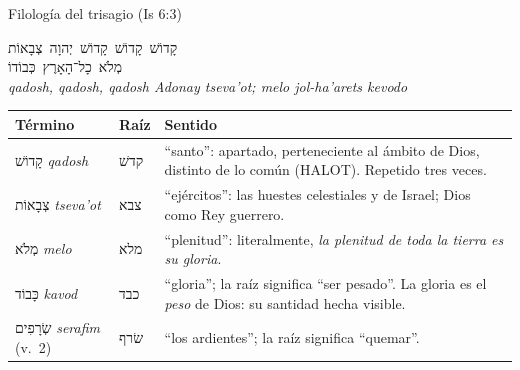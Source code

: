 \documentclass[hyperref={bookmarks=false},aspectratio=169]{beamer}
\newcommand{\heb}[1]{\mbox{\foreignlanguage{hebrew}{#1}}}
\begin{document}
\begin{frame}{Filología del trisagio (Is 6:3)}
\begin{center}
{\Large\heb{קָדוֹשׁ קָדוֹשׁ קָדוֹשׁ יְהוָה צְבָאוֹת}}\\[2pt]
{\large\heb{מְלֹא כָל־הָאָרֶץ כְּבוֹדוֹ}}\\[2pt]
{\footnotesize\emph{qadosh, qadosh, qadosh Adonay tseva'ot; melo jol-ha'arets kevodo}}
\end{center}
\renewcommand{\arraystretch}{1.2}\scriptsize
\begin{tabular}{@{}>{\RaggedRight\arraybackslash}p{2.5cm}>{\RaggedRight\arraybackslash}p{1.5cm}>{\RaggedRight\arraybackslash}p{7.6cm}@{}}
\toprule
\textbf{Término} & \textbf{Raíz} & \textbf{Sentido} \\ \midrule
\heb{קָדוֹשׁ} \emph{qadosh} & \heb{קדשׁ} & ``santo'': apartado, perteneciente al ámbito de Dios, distinto de lo común (HALOT). Repetido tres veces. \\
\heb{צְבָאוֹת} \emph{tseva'ot} & \heb{צבא} & ``ejércitos'': las huestes celestiales y de Israel; Dios como Rey guerrero. \\
\heb{מְלֹא} \emph{melo} & \heb{מלא} & ``plenitud'': literalmente, \emph{la plenitud de toda la tierra es su gloria}. \\
\heb{כָּבוֹד} \emph{kavod} & \heb{כבד} & ``gloria''; la raíz significa ``ser pesado''. La gloria es el \emph{peso} de Dios: su santidad hecha visible. \\
\heb{שְׂרָפִים} \emph{serafim} (v.~2) & \heb{שׂרף} & ``los ardientes''; la raíz significa ``quemar''. \\
\bottomrule
\end{tabular}
\end{frame}
\end{document}
